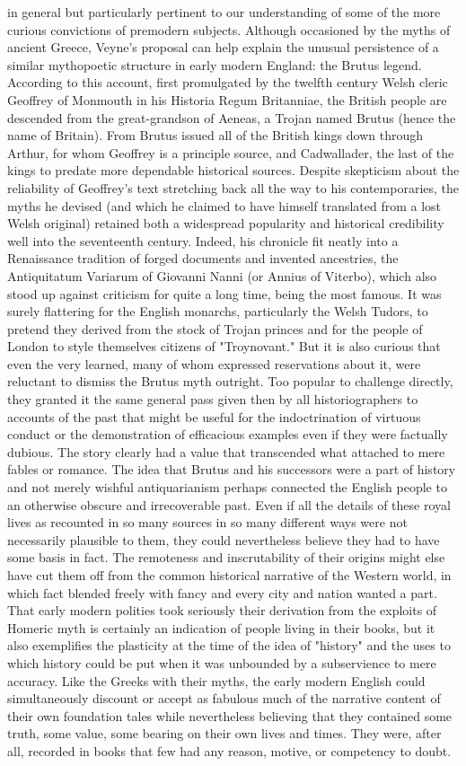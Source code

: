 in general but particularly pertinent to our understanding of some of the more curious convictions of premodern subjects.
	Although occasioned by the myths of ancient Greece, Veyne's proposal can help explain the unusual persistence of a similar mythopoetic structure in early modern England: the Brutus legend. According to this account, first promulgated by the twelfth century Welsh cleric Geoffrey of Monmouth in his Historia Regum Britanniae, the British people are descended from the great-grandson of Aeneas, a Trojan named Brutus (hence the name of Britain). From Brutus issued all of the British kings down through Arthur, for whom Geoffrey is a principle source, and Cadwallader, the last of the kings to predate more dependable historical sources. Despite skepticism about the reliability of Geoffrey's text stretching back all the way to his contemporaries, the myths he devised (and which he claimed to have himself translated from a lost Welsh original) retained both a widespread popularity and historical credibility well into the seventeenth century. Indeed, his chronicle fit neatly into a Renaissance tradition of forged documents and invented ancestries, the Antiquitatum Variarum of Giovanni Nanni (or Annius of Viterbo), which also stood up against criticism for quite a long time, being the most famous. It was surely flattering for the English monarchs, particularly the Welsh Tudors, to pretend they derived from the stock of Trojan princes and for the people of London to style themselves citizens of "Troynovant." But it is also curious that even the very learned, many of whom expressed reservations about it, were reluctant to dismiss the Brutus myth outright. Too popular to challenge directly, they granted it the same general pass given then by all historiographers to accounts of the past that might be useful for the indoctrination of virtuous conduct or the demonstration of efficacious examples even if they were factually dubious. The story clearly had a value that transcended what attached to mere fables or romance. The idea that Brutus and his successors were a part of history and not merely wishful antiquarianism perhaps connected the English people to an otherwise obscure and irrecoverable past. Even if all the details of these royal lives as recounted in so many sources in so many different ways were not necessarily plausible to them, they could nevertheless believe they had to have some basis in fact. The remoteness and inscrutability of their origins might else have cut them off from the common historical narrative of the Western world, in which fact blended freely with fancy and every city and nation wanted a part. That early modern polities took seriously their derivation from the exploits of Homeric myth is certainly an indication of people living in their books, but it also exemplifies the plasticity at the time of the idea of "history" and the uses to which history could be put when it was unbounded by a subservience to mere accuracy. Like the Greeks with their myths, the early modern English could simultaneously discount or accept as fabulous much of the narrative content of their own foundation tales while nevertheless believing that they contained some truth, some value, some bearing on their own lives and times. They were, after all, recorded in books that few had any reason, motive, or competency to doubt.
